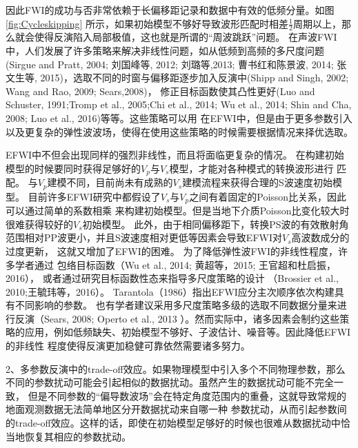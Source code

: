 因此FWI的成功与否非常依赖于长偏移距记录和数据中有效的低频分量。如图\ref{fig:Cycleskipping}
所示，如果初始模型不够好导致波形匹配时相差$\frac{1}{2}$周期以上，那么就会使得反演陷入局部极值，这也就是所谓的“周波跳跃”问题。
在声波FWI中，人们发展了许多策略来解决非线性问题，如从低频到高频的多尺度问题(Sirgue and
Pratt, 2004\cite{sirgue.pratt:2004}; 刘国峰等, 2012\cite{刘国峰2012};
刘璐等,2013\cite{刘璐2013}; 曹书红和陈景波, 2014\cite{曹书红2014}; 
张文生等, 2015\cite{张文生2015})，选取不同的时窗与偏移距逐步加入反演中(Shipp and
Singh, 2002\cite{shipp:2002}; Wang and Rao, 2009\cite{WangEtAl2009}; Sears,2008\cite{sears2008})，
修正目标函数使其凸性更好(Luo and Schuster, 1991\cite{luo1991};Tromp et al.,
2005\cite{tromp2005seismic};Chi
et al., 2014\cite{ChiEtAl2014}; Wu et al., 2014\cite{Wu2014b}; Shin and Cha,
2008\cite{shin.cha:2008}; Luo et al., 2016\cite{Luo2016})等等。这些策略可以用
在EFWI中，但是由于更多参数引入以及更复杂的弹性波波场，使得在使用这些策略的时候需要根据情况来择优选取。

EFWI中不但会出现同样的强烈非线性，而且将面临更复杂的情况。
在构建初始模型的时候要同时获得足够好的$V_p$与$V_s$模型，才能对各种模式的转换波形进行
匹配。
与$V_p$建模不同，目前尚未有成熟的$V_s$建模流程来获得合理的S波速度初始模型。
目前许多EFWI研究中都假设了$V_s$与$V_p$之间有着固定的Poisson比关系，因此可以通过简单的系数相乘
来构建初始模型。但是当地下介质Poisson比变化较大时很难获得较好的$V_s$初始模型。
此外，由于相同偏移距下，转换PS波的有效散射角范围相对PP波更小，并且S波速度相对更低等因素会导致EFWI对$V_s$高波数成分的过度更新，
这就又增加了EFWI的困难。
为了降低弹性波FWI的非线性程度，许多学者通过
包络目标函数（Wu et al., 2014\cite{Wu2014b}; 黄超等，2015\cite{黄超2015};
王官超和杜启振，2016\cite{王官超2016}），
或者通过研究目标函数性态来指导多尺度策略的设计
（Brossier et al., 2010\cite{BrossierEtAl2010};王毓玮等，2016\cite{王毓玮2016}）。
Tarantola（1986）\cite{tarantola:1986}指出EFWI应分主次顺序依次构建具有不同影响的参数。
也有学者建议采用多尺度策略多级的选取不同数据分量来进行反演（Sears, 2008\cite{sears2008}; Operto et al., 2013
\cite{operto2013guided}）。然而实际中，诸多因素会制约这些策略的应用，例如低频缺失、初始模型不够好、子波估计、噪音等。因此降低EFWI的非线性
程度使得反演更加稳健可靠依然需要诸多努力。

2、多参数反演中的trade-off效应。如果物理模型中引入多个不同物理参数，那么不同的参数扰动可能会引起相似的数据扰动。虽然产生的数据扰动可能不完全一致，
但是不同参数的“偏导数波场\cite{pratt1998gauss}”会在特定角度范围内的重叠，这就导致常规的地面观测数据无法简单地区分开数据扰动来自哪一种
参数扰动，从而引起参数间的trade-off效应。这样的话，即使在初始模型足够好的时候也很难从数据扰动中恰当地恢复其相应的参数扰动。

